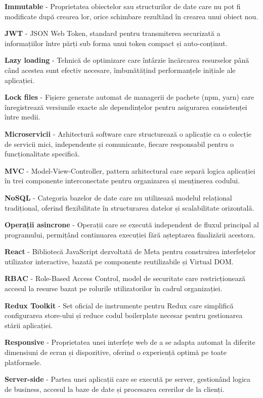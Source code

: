 \documentclass[12pt,a4paper]{report}
\begin{document}
\textbf{Immutable} - Proprietatea obiectelor sau structurilor de date care nu pot fi modificate după crearea lor, orice schimbare rezultând în crearea unui obiect nou.

\textbf{JWT} - JSON Web Token, standard pentru transmiterea securizată a informațiilor între părți sub forma unui token compact și auto-conținut.

\textbf{Lazy loading} - Tehnică de optimizare care întârzie încărcarea resurselor până când acestea sunt efectiv necesare, îmbunătățind performanțele inițiale ale aplicației.

\textbf{Lock files} - Fișiere generate automat de managerii de pachete (npm, yarn) care înregistrează versiunile exacte ale dependințelor pentru asigurarea consistenței între medii.

\textbf{Microservicii} - Arhitectură software care structurează o aplicație ca o colecție de servicii mici, independente și comunicante, fiecare responsabil pentru o funcționalitate specifică.

\textbf{MVC} - Model-View-Controller, pattern arhitectural care separă logica aplicației în trei componente interconectate pentru organizarea și menținerea codului.

\textbf{NoSQL} - Categoria bazelor de date care nu utilizează modelul relațional tradițional, oferind flexibilitate în structurarea datelor și scalabilitate orizontală.

\textbf{Operații asincrone} - Operații care se execută independent de fluxul principal al programului, permițând continuarea execuției fără așteptarea finalizării acestora.

\textbf{React} - Bibliotecă JavaScript dezvoltată de Meta pentru construirea interfețelor utilizator interactive, bazată pe componente reutilizabile și Virtual DOM.

\textbf{RBAC} - Role-Based Access Control, model de securitate care restricționează accesul la resurse bazat pe rolurile utilizatorilor în cadrul organizației.

\textbf{Redux Toolkit} - Set oficial de instrumente pentru Redux care simplifică configurarea store-ului și reduce codul boilerplate necesar pentru gestionarea stării aplicației.

\textbf{Responsive} - Proprietatea unei interfețe web de a se adapta automat la diferite dimensiuni de ecran și dispozitive, oferind o experiență optimă pe toate platformele.

\textbf{Server-side} - Partea unei aplicații care se execută pe server, gestionând logica de business, accesul la baze de date și procesarea cererilor de la clienți.
\end{document}
